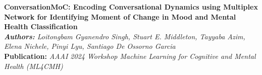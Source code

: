 \textbf{ConversationMoC: Encoding Conversational Dynamics using Multiplex Network for Identifying Moment of Change in Mood and Mental Health Classification}\\
\textit{\textbf{Authors:}  Loitongbam Gyanendro Singh, Stuart E. Middleton, Tayyaba Azim, Elena Nichele, Pinyi Lyu, Santiago De Ossorno Garcia}\\
\textbf{Publication:} \textit{AAAI 2024 Workshop Machine Learning for Cognitive and Mental Health (ML4CMH)}\\